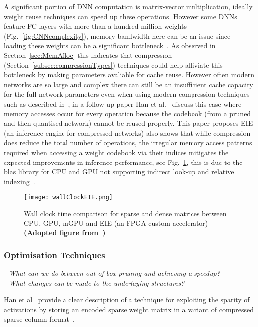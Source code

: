 \documentclass[../../D1.tex]{subfiles}
\begin{document}
A significant portion of DNN computation is matrix-vector multiplication, ideally weight reuse techniques can speed up these operations.
However some DNNs feature FC layers with more than a hundred million weights (Fig.~\ref{fig:CNNcomplexity}), memory bandwidth here can be an issue since loading these weights can be a significant bottleneck~\autocite{qiuGoingDeeperEmbedded2016}. 
As observed in Section~\ref{sec:MemAlloc} this indicates that compression (Section~\ref{subsec:compressionTypes}) techniques could help alliviate this bottleneck by making parameters avaliable for cache reuse.
However often modern networks are so large and complex there can still be an insufficient cache capacity for the full network parameters even when using modern compression techniques such as described in~\autocite{hanDeepCompressionCompressing2016}, in a follow up paper Han et al.~\autocite{hanEIEEfficientInference2016} discuss this case where memory accesses occur for every operation because the codebook (from a pruned and then quantised network) cannot be reused properly.
This paper proposes EIE (an inference engine for compressed networks) also shows that while compression does reduce the total number of operations, the irregular memory access patterns required when accessing a weight codebook via their indices mitigates the expected improvements in inference performance, see Fig.~\ref{fig:wallClockEIE}, this is due to the \acrshort{blas} library for CPU and GPU not supporting indirect look-up and relative indexing~\autocite{hanDeepCompressionCompressing2016}.


\begin{figure}[H]
    \texttt{[image: wallClockEIE.png]} 
    \caption{Wall clock time comparison for sparse and dense matrices between CPU, GPU, mGPU and EIE (an FPGA custom accelerator)\\ \textbf{(Adopted figure from~\autocite{hanEIEEfficientInference2016})}}
    \label{fig:wallClockEIE}   
\end{figure}

\subsubsection{Optimisation Techniques}
\emph{
- What can we do between out of box pruning and achieving a speedup?\\
- What changes can be made to the underlaying structures?
}


 Han et al~\autocite{hanEIEEfficientInference2016} provide a clear description of a technique for exploiting the sparity of activations by storing an encoded sparse weight matrix in a variant of compressed sparse column format~\autocite{vuducAutomaticPerformanceTuning}.
\end{document}
